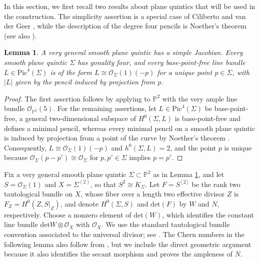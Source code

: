 \documentclass[oneside,11pt]{amsart}
\makeatletter
\newtheorem{lem}[thm]{Lemma}
\theoremstyle{definition}
\theoremstyle{remark}
\let\origsection\section
\renewcommand\section{\@ifstar{\starsection}{\nostarsection}}
\newcommand\nostarsection[1]
{\sectionprelude\origsection{#1}\sectionpostlude}
\newcommand\starsection[1]
{\sectionprelude\origsection*{#1}\sectionpostlude}
\newcommand\sectionprelude{%
  \vspace{1em}
}
\newcommand\sectionpostlude{%
  \vspace{1em}
}
\numberwithin{thm}{section}
\numberwithin{equation}{section}
\makeatother
\begin{document}
\section{The explicit construction}\label{sec:construction}

In this section, we first recall two results about plane quintics that will be used in the construction.  The simplicity assertion is a special case of Ciliberto and van der Geer \cite[Corollary~1.2]{CvG92}, while the description of the degree four pencils is Noether's theorem \cite[Theorem~2.1]{Har02} (see also \cite[Theorem~2.3.1]{Nam84}).


\begin{lem}\label{lem:plane-quintic}
A very general smooth plane quintic has a simple Jacobian.  Every smooth plane quintic $\Sigma$ has gonality four, and every base-point-free line bundle $L\in\mathrm{Pic}^4(\Sigma)$ is of the form $L\cong\mathcal{O}_\Sigma(1)(-p)$ for a unique point $p\in\Sigma$, with $|L|$ given by the pencil induced by projection from $p$.
\end{lem}

\begin{proof}
The first assertion follows by applying \cite[Corollary 1.2]{CvG92} to $\mathbb{P}^2$ with the very ample line bundle $\mathcal{O}_{\mathbb{P}^2}(5)$.  For the remaining assertions, let $L\in\mathrm{Pic}^4(\Sigma)$ be base-point-free, a general
two-dimensional subspace of $H^0(\Sigma,L)$ is base-point-free and defines a minimal pencil, whereas every minimal pencil on a smooth plane quintic is induced by projection from a point of the curve by Noether's theorem \cite[Theorem 2.1]{Har02}.  Consequently, $L\cong\mathcal{O}_\Sigma(1)(-p)$ and $h^0(\Sigma,L)=2$, and the point $p$ is unique because $\mathcal{O}_\Sigma(p-p')\cong\mathcal{O}_\Sigma$ for $p,p'\in\Sigma$ implies $p=p'$.
\end{proof}



Fix a very general smooth plane quintic
$\Sigma\subset\mathbb{P}^2$ as in Lemma \ref{lem:plane-quintic}, and let $S=\mathcal{O}_\Sigma(1)$ and $X=\Sigma^{(2)}$, so that $S^2\cong K_\Sigma$.  Let $F=S^{[2]}$ be the rank two tautological bundle on $X$, whose fiber over a length two effective divisor $Z$ is $F_Z=H^0(Z,S|_Z)$, and denote $H^0(\Sigma,S)$ and $\mathrm{det}(F)$ by $W$ and $N$, respectively.  Choose a nonzero element of $\mathrm{det}(W)$, which identifies the constant line bundle $\mathrm{det}W\otimes\mathcal{O}_X$ with $\mathcal{O}_X$.  We use the standard tautological bundle convention associated to the universal divisor; see \cite[Section 1.2]{Kru20}.  The Chern numbers in the following lemma also follow from \cite[Lemmas 2.3 and 2.4]{Kru25}, but we include the direct geometric argument because it also identifies the secant morphism and proves the ampleness of $N$.
\end{document}
